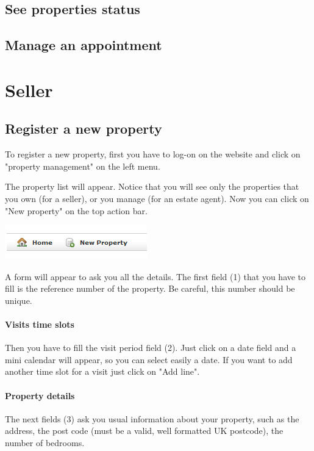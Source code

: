 \documentclass[a4paper,12pt]{article}
\begin{document}
\subsection{See properties status}
\subsection{Manage an appointment}

\section{Seller}
\subsection{Register a new property}
To register a new property, first you have to log-on on the website and click on "property management" on the left menu.

The property list will appear. Notice that you will see only the properties that you own (for a seller), or you manage (for an estate agent). 
Now you can click on "New property" on the top action bar.
\begin{center}
\includegraphics[scale=0.7]{pics/new_property.jpg}
\end{center}


A form will appear to ask you all the details. The first field (1) that you have to fill is the reference number of the property. Be careful, this number should be unique.

\paragraph{Visits time slots}

Then you have to fill the visit period field (2). 
Just click on a date field and a mini calendar will appear, so you can select easily a date. 
If you want to add another time slot for a visit just click on "Add line".

\paragraph{Property details}

The next fields (3) ask you usual information about your property, such as the address, the post code (must be a valid, well formatted UK postcode), the number of bedrooms.
\end{document}
